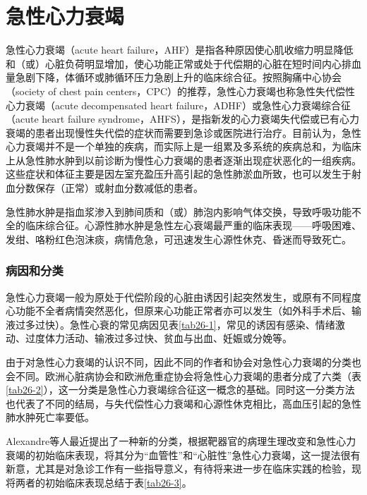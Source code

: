 \protect\hypertarget{text00070.html}{}{}

\chapter{急性心力衰竭}

急性心力衰竭（acute heart
failure，AHF）是指各种原因使心肌收缩力明显降低和（或）心脏负荷明显增加，使心功能正常或处于代偿期的心脏在短时间内心排血量急剧下降，体循环或肺循环压力急剧上升的临床综合征。按照胸痛中心协会（society
of chest pain
centers，CPC）的推荐，急性心力衰竭也称急性失代偿性心力衰竭（acute
decompensated heart failure，ADHF）或急性心力衰竭综合征（acute heart
failure
syndrome，AHFS），是指新发的心力衰竭失代偿或已有心力衰竭的患者出现慢性失代偿的症状而需要到急诊或医院进行治疗。目前认为，急性心力衰竭并不是一个单独的疾病，而实际上是一组累及多系统的疾病总和，为临床上从急性肺水肿到以前诊断为慢性心力衰竭的患者逐渐出现症状恶化的一组疾病。这些症状和体征主要是因左室充盈压升高引起的急性肺淤血所致，也可以发生于射血分数保存（正常）或射血分数减低的患者。

急性肺水肿是指血浆渗入到肺间质和（或）肺泡内影响气体交换，导致呼吸功能不全的临床综合征。心源性肺水肿是急性左心衰竭最严重的临床表现------呼吸困难、发绀、咯粉红色泡沫痰，病情危急，可迅速发生心源性休克、昏迷而导致死亡。

\subsection{病因和分类}

急性心力衰竭一般为原处于代偿阶段的心脏由诱因引起突然发生，或原有不同程度心功能不全者病情突然恶化，但原来心功能正常者亦可以发生（如外科手术后、输液过多过快）。急性心衰的常见病因见表\ref{tab26-1}，常见的诱因有感染、情绪激动、过度体力活动、输液过多过快、贫血与出血、妊娠或分娩等。

由于对急性心力衰竭的认识不同，因此不同的作者和协会对急性心力衰竭的分类也会不同。欧洲心脏病协会和欧洲危重症协会将急性心力衰竭的患者分成了六类（表\ref{tab26-2}），这一分类是急性心力衰竭综合征这一概念的基础。同时这一分类方法也代表了不同的结局，与失代偿性心力衰竭和心源性休克相比，高血压引起的急性肺水肿死亡率要低。

Alexandre等人最近提出了一种新的分类，根据靶器官的病理生理改变和急性心力衰竭的初始临床表现，将其分为“血管性”和“心脏性”急性心力衰竭，这一提法很有新意，尤其是对急诊工作有一些指导意义，有待将来进一步在临床实践的检验，现将两者的初始临床表现总结于表\ref{tab26-3}。

